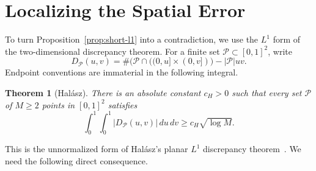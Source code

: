 \documentclass[11pt]{article}
\newtheorem{theorem}{Theorem}[section]
\theoremstyle{remark}
\numberwithin{equation}{section}
\begin{document}
\section{Localizing the Spatial Error}
To turn Proposition~\ref{prop:short-l1} into a contradiction, we use the
$L^1$ form of the two-dimensional discrepancy theorem. For a finite set
$\mathcal P\subset[0,1]^2$, write
\[
  D_{\mathcal P}(u,v)
  =\#\bigl(\mathcal P\cap((0,u]\times(0,v])\bigr)
   -|\mathcal P|uv.
\]
Endpoint conventions are immaterial in the following integral.

\begin{theorem}[Hal\'asz]\label{thm:halasz}
There is an absolute constant $c_H>0$ such that every set $\mathcal P$ of
$M\geq2$ points in $[0,1]^2$ satisfies
\[
  \int_0^1\int_0^1|D_{\mathcal P}(u,v)|\,du\,dv
  \geq c_H\sqrt{\log M}.
\]
\end{theorem}
This is the unnormalized form of Hal\'asz's planar $L^1$ discrepancy
theorem~\cite{halasz}. We need the following direct consequence.
\end{document}
